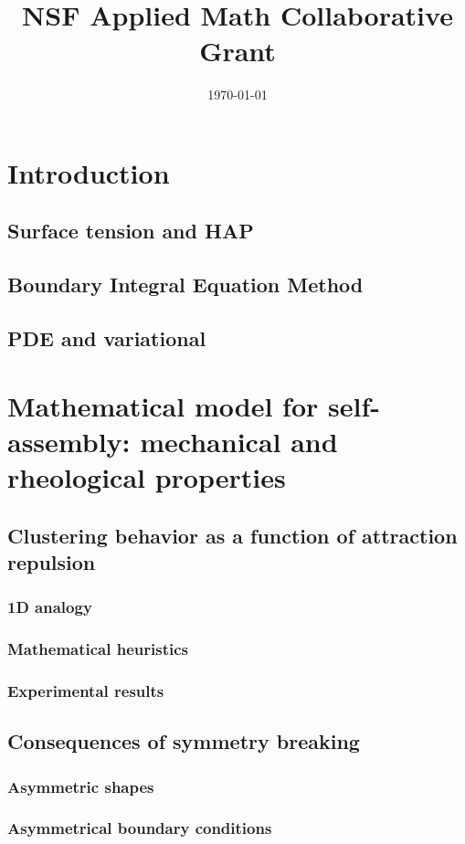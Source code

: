 \documentclass[preprint,11pt]{article}
\title{NSF Applied Math Collaborative Grant}
\author{}
\date{\today}
\begin{document}
\maketitle
\everymath{\displaystyle}

\section{Introduction}
\subsection{Surface tension and HAP}
\subsection{Boundary Integral Equation Method}
\subsection{PDE and variational }

\section{Mathematical model for self-assembly: mechanical and rheological properties}
\subsection{Clustering behavior as a function of attraction repulsion}
\subsubsection{1D analogy}
\subsubsection{Mathematical heuristics}
\subsubsection{Experimental results}
\subsection{Consequences of symmetry breaking}
\subsubsection{Asymmetric shapes}
\subsubsection{Asymmetrical boundary conditions}
\end{document}
